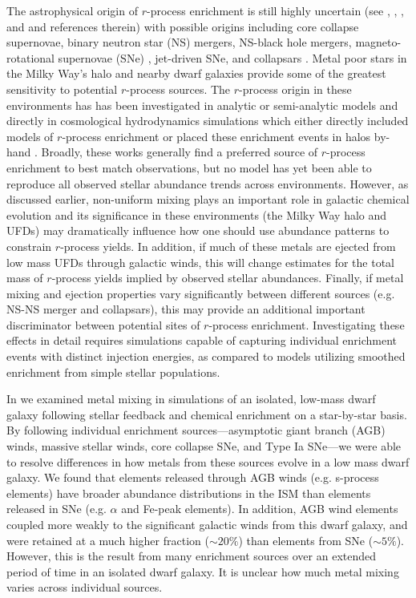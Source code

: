 \documentclass[twocolumn]{aastex62}
\begin{document}
The astrophysical origin of $r$-process enrichment is still highly uncertain (see \citet{Thielmann2017}, \citet{Frebel2018}, \citet{Cote2019}, and \citet{Cowan2019} and references therein) with possible origins including core collapse supernovae, binary neutron star (NS) mergers, NS-black hole mergers, magneto-rotational supernovae (SNe) \citep[e.g.][]{Winteler2012}, jet-driven SNe, and collapsars \citep[e.g.][]{Siegel2019} . Metal poor stars in the Milky Way's halo and nearby dwarf galaxies provide some of the greatest sensitivity to potential $r$-process sources. The $r$-process origin in these environments has has been investigated in analytic or semi-analytic models \citep[e.g.][]{Beniamini2018,Macias2018,Macias2019,SchonrichWeinberg2019,Wehmeyer2019} and directly in cosmological hydrodynamics simulations which either directly included models of $r$-process enrichment or placed these enrichment events in halos by-hand \citep[e.g.][]{Shen2015,vandeVoort2015,vandeVoort2019,Safarzadeh2017}. Broadly, these works generally find a preferred source of $r$-process enrichment to best match observations, but no model has yet been able to reproduce all observed stellar abundance trends across environments. However, as discussed earlier, non-uniform mixing plays an important role in galactic chemical evolution and its significance in these environments (the Milky Way halo and UFDs) may dramatically influence how one should use abundance patterns to constrain $r$-process yields. In addition, if much of these metals are ejected from low mass UFDs through galactic winds, this will change estimates for the total mass of $r$-process yields implied by observed stellar abundances. Finally, if metal mixing and ejection properties vary significantly between different sources (e.g. NS-NS merger and collapsars), this may provide an additional important discriminator between potential sites of $r$-process enrichment. Investigating these effects in detail requires simulations capable of capturing individual enrichment events with distinct injection energies, as compared to models utilizing smoothed enrichment from simple stellar populations. 

In \cite{Emerick2018b} we examined metal mixing in simulations of an isolated, low-mass dwarf galaxy following stellar feedback and chemical enrichment on a star-by-star basis. By following individual enrichment sources---asymptotic giant branch (AGB) winds, massive stellar winds, core collapse SNe, and Type Ia SNe---we were able to resolve differences in how metals from these sources evolve in a low mass dwarf galaxy. We found that elements released through AGB winds (e.g. s-process elements) have broader abundance distributions in the ISM than elements released in SNe (e.g. $\alpha$ and Fe-peak elements). In addition, AGB wind elements coupled more weakly to the significant galactic winds from this dwarf galaxy, and were retained at a much higher fraction ($\sim 20\%$) than elements from SNe ($\sim 5\%$). However, this is the result from many enrichment sources over an extended period of time in an isolated dwarf galaxy. It is unclear how much metal mixing varies across individual sources. 
\end{document}
